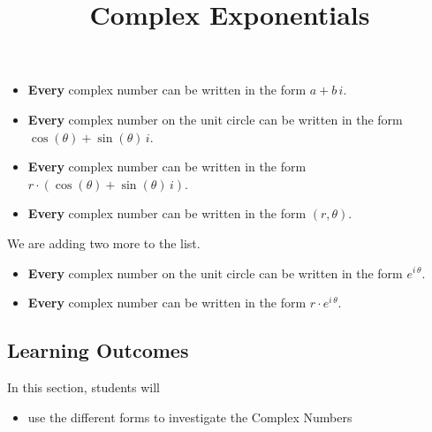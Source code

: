 \documentclass{ximera}
\title{Complex Exponentials}
\begin{document}
\begin{abstract}
%
\end{abstract}
\maketitle



\begin{itemize}
\item \textbf{\textcolor{purple!85!blue}{Every}} complex number can be written in the form $a + b \, i$.
\item \textbf{\textcolor{purple!85!blue}{Every}} complex number on the unit circle can be written in the form $\cos(\theta) + \sin(\theta) \, i$.
\item \textbf{\textcolor{purple!85!blue}{Every}} complex number can be written in the form $r \cdot (\cos(\theta) + \sin(\theta) \, i)$.
\item \textbf{\textcolor{purple!85!blue}{Every}} complex number can be written in the form $(r, \theta)$.
\end{itemize}

We are adding two more to the list.



\begin{itemize}
\item \textbf{\textcolor{purple!85!blue}{Every}} complex number on the unit circle can be written in the form $e^{i \, \theta}$.
\item \textbf{\textcolor{purple!85!blue}{Every}} complex number can be written in the form $r \cdot e^{i \, \theta}$.
\end{itemize}






\subsection{Learning Outcomes}

\begin{sectionOutcomes}
In this section, students will 

\begin{itemize}
\item use the different forms to investigate the Complex Numbers
\end{itemize}
\end{sectionOutcomes}
\end{document}
